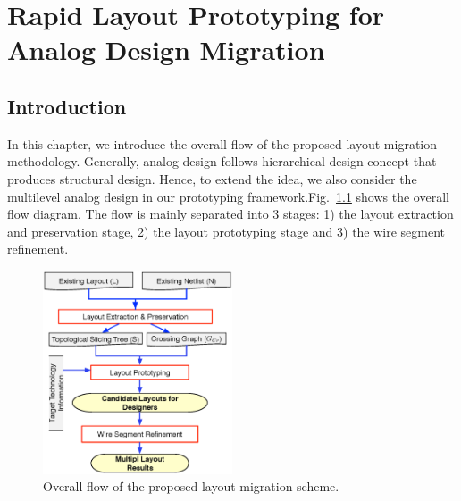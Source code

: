 
\chapter{Rapid Layout Prototyping for Analog Design Migration}\label{chap:RLPADM}
  
  \section{Introduction}\label{sec:RLPADMIntro}

    In this chapter, we introduce the overall flow of the proposed layout migration methodology. Generally, analog design follows hierarchical design concept that produces structural design. 
    Hence, to extend the idea, we also consider the multilevel analog design in our prototyping framework.Fig.~\ref{fig:Flow} shows the overall flow diagram. The flow is mainly separated into 3 stages: 1) the layout extraction and preservation stage, 2) the layout prototyping stage and 3) the wire segment refinement. 
    
    
    \begin{figure}[ht]
      \centering
      \includegraphics[width=0.5\textwidth]{Fig/Chapter4/Flow.eps}
      \caption{Overall flow of the proposed layout migration scheme.} 
      \label{fig:Flow}
    \end{figure}

